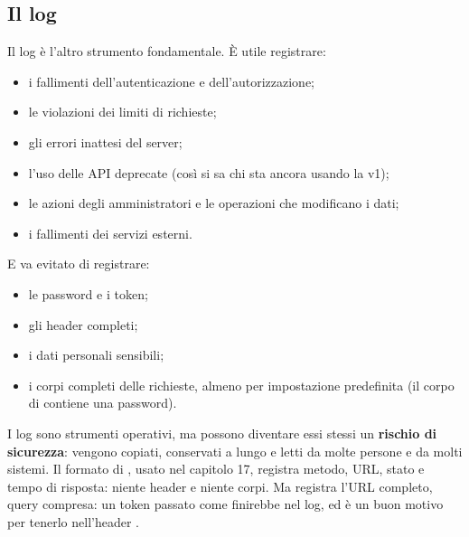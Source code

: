 
\subsection{Il log}

Il log è l'altro strumento fondamentale. È utile registrare:

\begin{itemize}
  \item i fallimenti dell'autenticazione e dell'autorizzazione;
  \item le violazioni dei limiti di richieste;
  \item gli errori inattesi del server;
  \item l'uso delle API deprecate (così si sa chi sta ancora usando la v1);
  \item le azioni degli amministratori e le operazioni che modificano i dati;
  \item i fallimenti dei servizi esterni.
\end{itemize}

E va evitato di registrare:

\begin{itemize}
  \item le password e i token;
  \item gli header  completi;
  \item i dati personali sensibili;
  \item i corpi completi delle richieste, almeno per impostazione predefinita (il
        corpo di  contiene una password).
\end{itemize}

I log sono strumenti operativi, ma possono diventare essi stessi un
\textbf{rischio di sicurezza}: vengono copiati, conservati a lungo e letti da
molte persone e da molti sistemi. Il formato  di , usato
nel capitolo 17, registra metodo, URL, stato e tempo di risposta: niente header
e niente corpi. Ma registra l'URL completo, query compresa: un token passato
come  finirebbe nel log, ed è un buon motivo per tenerlo
nell'header .

